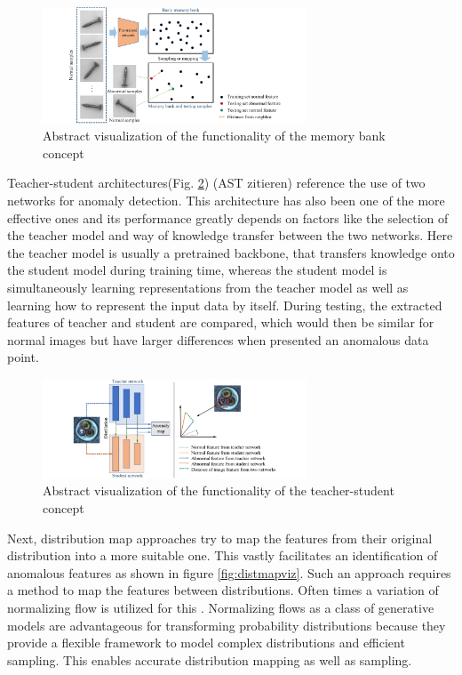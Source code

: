 \begin{figure}[H]
    \centering
    \includegraphics[width=0.7\textwidth]{figures/approachvizgeneral/memorybankviz.jpg}
    \caption{Abstract visualization of the functionality of the memory bank concept \cite{liu2024deep}}
    \label{fig:memorybankviz}
\end{figure}


Teacher-student architectures(Fig. \ref{fig:TSviz}) \cite{revdist2023} (AST zitieren) reference the use of two networks for anomaly detection. 
This architecture has also been one of the more effective ones and its performance greatly depends on factors like the selection of the teacher model and way 
of knowledge transfer between the two networks. Here the teacher model is usually a pretrained 
backbone, that transfers knowledge onto the student model during training time, whereas the student model is simultaneously learning representations from the teacher model as well as learning 
how to represent the input data by itself. During testing, the extracted features of teacher and student are compared, which would then be similar for normal images but have larger differences 
when presented an anomalous data point.\newline


\begin{figure}[H]
    \centering
    \includegraphics[width=0.7\textwidth]{figures/approachvizgeneral/TSviz.jpg}
    \caption{Abstract visualization of the functionality of the teacher-student concept \cite{liu2024deep}}
    \label{fig:TSviz}
\end{figure}



Next, distribution map approaches \cite{csflow2022} try to map the features from their original distribution into a more suitable one. This vastly facilitates an identification of anomalous features as shown in 
figure \ref{fig:distmapviz}. Such an approach requires a method to map the features between distributions. Often times a variation of normalizing flow is utilized for this \cite{liu2024deep}. 
Normalizing flows as a class of generative models \cite{Kobyzev_2021normalizingflowexplanation} are advantageous for transforming probability distributions because they provide a flexible 
framework to model complex distributions and efficient sampling. This enables accurate distribution mapping as well as sampling. \newline


